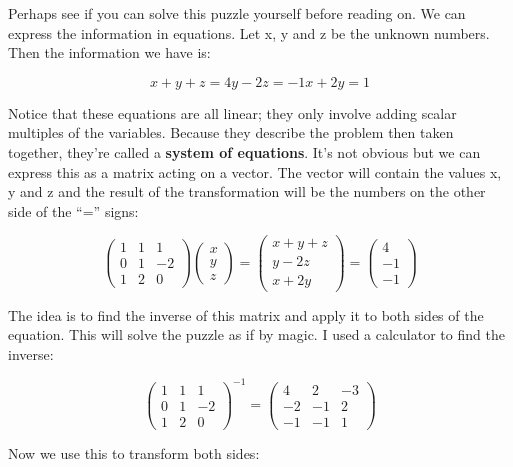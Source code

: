 \documentclass[oneside,english]{amsbook}
\numberwithin{section}{chapter}
\theoremstyle{plain}
\theoremstyle{definition}
\begin{document}
Perhaps see if you can solve this puzzle yourself before reading on. We
can express the information in equations. Let x, y and z be the unknown
numbers. Then the information we have is:

\[{x + y + z = 4
}{y - 2z = - 1
}{x + 2y = 1}\]

Notice that these equations are all linear; they only involve adding
scalar multiples of the variables. Because they describe the problem
then taken together, they're called a \textbf{system of equations}. It's
not obvious but we can express this as a matrix acting on a vector. The
vector will contain the values x, y and z and the result of the
transformation will be the numbers on the other side of the ``='' signs:

\[\begin{pmatrix}
	1 & 1 & 1 \\
	0 & 1 & - 2 \\
	1 & 2 & 0
\end{pmatrix}\begin{pmatrix}
	x \\
	y \\
	z
\end{pmatrix} = \begin{pmatrix}
	x + y + z \\
	y - 2z \\
	x + 2y
\end{pmatrix} = \begin{pmatrix}
	4 \\
	- 1 \\
	- 1
\end{pmatrix}\]

The idea is to find the inverse of this matrix and apply it to both
sides of the equation. This will solve the puzzle as if by magic. I used
a calculator to find the inverse:

\[\begin{pmatrix}
	1 & 1 & 1 \\
	0 & 1 & - 2 \\
	1 & 2 & 0
\end{pmatrix}^{- 1} = \begin{pmatrix}
	4 & 2 & - 3 \\
	- 2 & - 1 & 2 \\
	- 1 & - 1 & 1
\end{pmatrix}\]

Now we use this to transform both sides:
\end{document}

